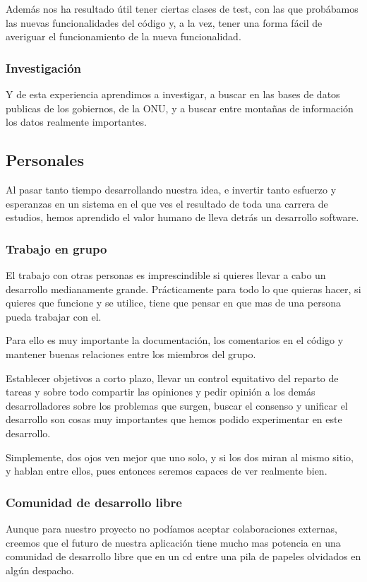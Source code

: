 Además nos ha resultado útil tener ciertas clases de test, con las que
probábamos las nuevas funcionalidades del código y, a la vez, tener una forma
fácil de averiguar el funcionamiento de la nueva funcionalidad.

\subsubsection*{Investigación}

Y de esta experiencia aprendimos a investigar, a buscar en las bases de datos
publicas de los gobiernos, de la ONU, y a buscar entre montañas de información
los datos realmente importantes.

\subsection*{Personales}

Al pasar tanto tiempo desarrollando nuestra idea, e invertir tanto esfuerzo y
esperanzas en un sistema en el que ves el resultado de toda una carrera de
estudios, hemos aprendido el valor humano de lleva detrás un desarrollo
software.

\subsubsection*{Trabajo en grupo}

El trabajo con otras personas es imprescindible si quieres llevar a cabo un
desarrollo medianamente grande. Prácticamente para todo lo que quieras hacer,
si quieres que funcione y se utilice, tiene que pensar en que mas de una
persona pueda trabajar con el.

Para ello es muy importante la documentación, los comentarios en el código y
mantener buenas relaciones entre los miembros del grupo.

Establecer objetivos a corto plazo, llevar un control equitativo del reparto de
tareas y sobre todo compartir las opiniones y pedir opinión a los demás
desarrolladores sobre los problemas que surgen, buscar el consenso y
unificar el desarrollo son cosas muy importantes que hemos podido experimentar
en este desarrollo.

Simplemente, dos ojos ven mejor que uno solo, y si los dos miran al mismo
sitio, y hablan entre ellos, pues entonces seremos capaces de ver realmente
bien.
\subsubsection*{Comunidad de desarrollo libre}
Aunque para nuestro proyecto no podíamos aceptar colaboraciones externas,
creemos que el futuro de nuestra aplicación tiene mucho mas potencia en una
comunidad de desarrollo libre que en un cd entre una pila de papeles olvidados
en algún despacho.

